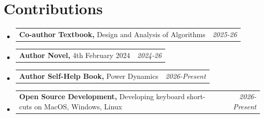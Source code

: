 \documentclass[a4paper,11pt]{article}
\makeatletter
\newcommand{\resumePOR}[3]{
\vspace{0.5mm}\item
    \begin{tabular*}{0.97\textwidth}[t]{l@{\extracolsep{\fill}}r}
        \textbf{#1}\hspace{0.3mm}#2 & \textit{\small{#3}} 
    \end{tabular*}
    \vspace{-2mm}
}
\newcommand{\resumeSubHeadingListStart}{\begin{itemize}[leftmargin=*,labelsep=0mm]}
\newcommand{\resumeSubHeadingListEnd}{\end{itemize}\vspace{2mm}}
\makeatother
\begin{document}
\section{\textbf{Contributions}}
\resumeSubHeadingListStart
\resumePOR{ Co-author Textbook, }
    {Design and Analysis of Algorithms}
    {2025-26}\vspace{-2 mm}
\resumePOR{ Author Novel, }
    {4th February 2024}
    {2024-26}\vspace{-2 mm}
\resumePOR{ Author Self-Help Book, }
    {Power Dynamics}
    {2026-Present}\vspace{-2 mm}
\resumePOR{ Open Source Development, }
    {Developing keyboard short-cuts on MacOS, Windows, Linux}
    {2026-Present}\vspace{-2 mm}
\resumeSubHeadingListEnd










\end{document}
